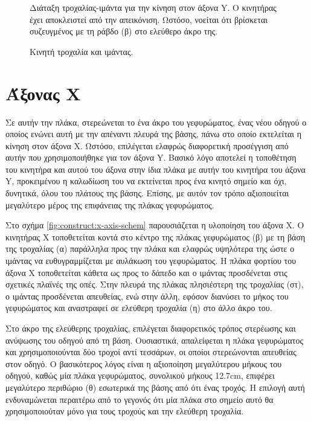 \begin{figure}
    \caption{Κινητή τροχαλία και ιμάντας. \label{fig:construct:belt-pulley-y}}
Διάταξη τροχαλίας-ιμάντα για την κίνηση στον άξονα Y. Ο κινητήρας έχει
αποκλειστεί από την απεικόνιση. Ωστόσο, νοείται ότι βρίσκεται συζευγμένος με τη
ράβδο (β) στο ελεύθερο άκρο της.
    \begin{center}%
    \def\svgwidth{0.7\textwidth}
    
    \end{center}
\end{figure}

\section{Άξονας X}

Σε αυτήν την πλάκα, στερεώνεται το ένα άκρο του γεφυρώματος, ένας νέου οδηγού ο
οποίος ενώνει αυτή με την απέναντι πλευρά της βάσης, πάνω στο οποίο εκτελείται η
κίνηση στον άξονα X.
Ωστόσο, επιλέγεται ελαφρώς διαφορετική προσέγγιση από αυτήν που χρησιμοποιήθηκε
για τον άξονα Y. Βασικό λόγο αποτελεί η τοποθέτηση του κινητήρα και αυτού του
άξονα στην ίδια πλάκα με αυτήν του κινητήρα του άξονα Y, προκειμένου η καλωδίωση
του να εκτείνεται προς ένα κινητό σημείο και όχι, δυνητικά, όλου του πλάτους της
βάσης. Επίσης, με αυτόν τον τρόπο αξιοποιείται μεγαλύτερο μέρος της επιφάνειας
της πλάκας γεφυρώματος.

Στο σχήμα \ref{fig:construct:x-axis-schem} παρουσιάζεται η υλοποίηση του άξονα
X.
Ο κινητήρας X τοποθετείται κοντά στο κέντρο της πλάκας γεφυρώματος (β) με τη
βάση της τροχαλίας (α) παράλληλα προς την πλάκα και ελαφρώς υψηλότερα της ώστε ο
ιμάντας να ευθυγραμμίζεται με αυλάκωση του γεφυρώματος. Η πλάκα φορτίου του
άξονα X τοποθετείται κάθετα ως προς το δάπεδο και ο ιμάντας προσδένεται στις
σχετικές πλαϊνές της οπές. Στην πλευρά της πλάκας πλησιέστερη της τροχαλίας
(στ), ο ιμάντας προσδένεται απευθείας, ενώ στην άλλη, εφόσον διανύσει το μήκος
του γεφυρώματος και αναστραφεί σε ελεύθερη τροχαλία (η) στο άλλο άκρο του.

Στο άκρο της ελεύθερης τροχαλίας, επιλέγεται διαφορετικός τρόπος στερέωσης και
ανύψωσης του οδηγού από τη βάση. Ουσιαστικά, απαλείφεται η πλάκα γεφυρώματος και
χρησιμοποιούνται δύο τροχοί αντί τεσσάρων, οι οποίοι στερεώνονται απευθείας στον
οδηγό. Ο βασικότερος λόγος είναι η αξιοποίηση μεγαλύτερου μήκους του οδηγού,
καθώς μία πλάκα γεφυρώματος, συνολικού μήκους 12.7cm, επιφέρει μεγαλύτερο
περιθώριο (θ) εσωτερικά της βάσης από ότι ένας τροχός. Η επιλογή αυτή
ενδυναμώνεται περαιτέρω από το γεγονός ότι μία πλάκα στο σημείο αυτό θα
χρησιμοποιούταν μόνο για τους τροχούς και την ελεύθερη τροχαλία.

